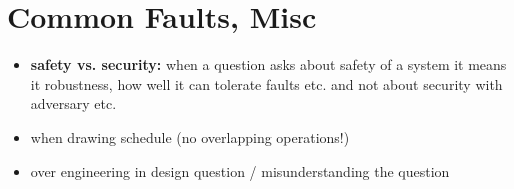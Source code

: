 \section{Common Faults, Misc}

\begin{itemize}
\item \textbf{safety vs. security:}
  when a question asks about
  safety of a system it means it robustness, how well it
  can tolerate faults etc. and not about security with adversary etc.
\item when drawing schedule (no overlapping operations!)
\item over engineering in design question / misunderstanding the question
\end{itemize}
